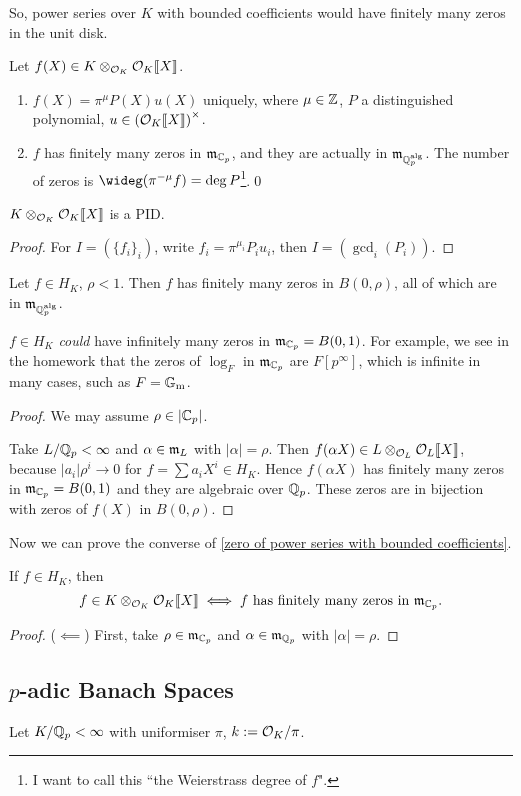 So, power series over $K$ with bounded coefficients would have finitely many zeros in the unit disk.
\begin{corollary}\label{zero of power series with bounded coefficients}
    Let $f(X)\in K\otimes_{\mathcal{O}_K}\mathcal{O}_K\llbracket X \rrbracket$.\begin{enumerate}
        \item $f(X) = \pi^\mu P(X) u(X)$ uniquely, where $\mu\in \mathbb{Z}$, $P$ a distinguished polynomial, $u\in\left( \mathcal{O}_K\llbracket X \rrbracket \right)^\times$.
        \item $f$ has finitely many zeros in $\mathfrak{m}_{\mathbb{C}_p}$, and they are actually in $\mathfrak{m}_{\mathbb{Q}_p^{\mathrm{alg}}}$. The number of zeros is $\wideg (\pi^{-\mu} f) = \deg P$\footnote{I want to call this ``the Weierstrass degree of $f$".}.\qed
    \end{enumerate}
\end{corollary}
\begin{corollary}
    $K\otimes_{\mathcal{O}_K}\mathcal{O}_K\llbracket X \rrbracket$ is a PID.
\end{corollary}
\begin{proof}
    For $I = (\{f_i\}_i)$, write $f_i = \pi^{\mu_i}P_iu_i$, then $I = \left(\gcd_i (P_i)\right)$.
\end{proof}

\begin{theorem}
    Let $f\in H_K$, $\rho < 1$. Then $f$ has finitely many zeros in $B(0, \rho)$, all of which are in $\mathfrak{m}_{\mathbb{Q}_p^{\mathrm{alg}}}$.
\end{theorem}
\begin{remark}
    $f\in H_K$ \textit{could} have infinitely many zeros in $\mathfrak{m}_{\mathbb{C}_p} = B(0, 1)$.
    For example, we see in the homework that the zeros of $\log_F$ in $\mathfrak{m}_{\mathbb{C}_p}$ are $F[p^\infty]$, which is infinite in many cases, such as $F = \mathbb{G}_{\mathrm{m}}$.
\end{remark}
\begin{proof}
    We may assume $\rho\in|\mathbb{C}_p|$.

    Take $L/\mathbb{Q}_p < \infty$ and $\alpha\in\mathfrak{m}_L$ with $|\alpha| = \rho$.
    Then $f(\alpha X)\in L\otimes_{\mathcal{O}_L}\mathcal{O}_L\llbracket X \rrbracket$, because $|a_i|\rho^i\to 0$ for $f = \sum a_iX^i\in H_K$.
    Hence $f(\alpha X)$ has finitely many zeros in $\mathfrak{m}_{\mathbb{C}_p} = B(0, 1)$ and they are algebraic over $\mathbb{Q}_p$.
    These zeros are in bijection with zeros of $f(X)$ in $B(0, \rho)$. 
\end{proof}

Now we can prove the converse of \cref{zero of power series with bounded coefficients}.
\begin{theorem}
    If $f\in H_K$, then\[f\in K\otimes_{\mathcal{O}_K}\mathcal{O}_K\llbracket X \rrbracket\iff f\text{ has finitely many zeros in }\mathfrak{m}_{\mathbb{C}_p}.\]
\end{theorem}
\begin{proof}
    ($\impliedby$)
    First, take $\rho\in \mathfrak{m}_{\mathbb{C}_p}$ and $\alpha\in \mathfrak{m}_{\mathbb{Q}_p}$ with $|\alpha| = \rho$.

\end{proof}

\subsection{\texorpdfstring{$p$-adic Banach Spaces}{}}
Let $K/\mathbb{Q}_p < \infty$ with uniformiser $\pi$, $k := \mathcal{O}_K/\pi$.

